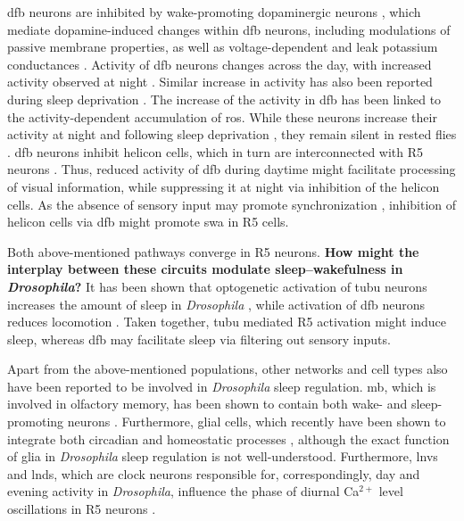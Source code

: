 \documentclass[../main.tex]{subfiles}
\begin{document}
\gls{dfb} neurons are inhibited by wake-promoting dopaminergic neurons \parencite{liuTwoDopaminergicNeurons2012}, which mediate dopamine-induced changes within \gls{dfb} neurons, including modulations of passive membrane properties, as well as voltage-dependent and leak potassium conductances \parencite{pimentelOperationHomeostaticSleep2016}. Activity of \gls{dfb} neurons changes across the day, with increased activity observed at night \parencite{raccugliaCoherentMultilevelNetwork2022}. Similar increase in activity has also been reported during sleep deprivation \parencite{pimentelOperationHomeostaticSleep2016}. The increase of the activity in \gls{dfb} has been linked to the activity-dependent accumulation of \gls{ros}.
While these neurons increase their activity at night and following sleep deprivation \parencite{raccugliaCoherentMultilevelNetwork2022}, they remain silent in rested flies \parencite{pimentelOperationHomeostaticSleep2016}.
\gls{dfb} neurons inhibit helicon cells, which in turn are interconnected with R5 neurons \parencite{suarez-grimaltNeuralArchitectureSleep2021,raccugliaCoherentMultilevelNetwork2022,shaferRegulationDrosophilaSleep2021}.
Thus, reduced activity of \gls{dfb} during daytime might facilitate processing of visual information, while suppressing it at night via inhibition of the helicon cells. As the absence of sensory input may promote synchronization \parencite{raccugliaCoherentMultilevelNetwork2022}, inhibition of helicon cells via \gls{dfb} might promote \gls{swa} in R5 cells.

Both above-mentioned pathways converge in R5 neurons. \textbf{How might the interplay between these circuits modulate sleep–wakefulness in \textit{Drosophila}?}
It has been shown that optogenetic activation of \gls{tubu} neurons increases the amount of sleep in \textit{Drosophila} \parencite{lamazeWakePromotingCircadianOutput2018}, while activation of \gls{dfb} neurons reduces locomotion \parencite{raccugliaCoherentMultilevelNetwork2022}. Taken together, \gls{tubu} mediated R5 activation might induce sleep, whereas \gls{dfb} may facilitate sleep via filtering out sensory inputs.

Apart from the above-mentioned populations, other networks and cell types also have been reported to be involved in \textit{Drosophila} sleep regulation. \gls{mb}, which is involved in olfactory memory, has been shown to contain both wake- and sleep-promoting neurons
\parencite{suarez-grimaltNeuralArchitectureSleep2021,dubowyCircadianRhythmsSleep2017}. Furthermore, glial cells, which recently have been shown to integrate both circadian and homeostatic processes \parencite{doppSinglecellTranscriptomicsReveals2024}, although the exact function of glia in \textit{Drosophila} sleep regulation is not well-understood. Furthermore,  \glspl{lnv} and \glspl{lnd}, which are clock neurons responsible for, correspondingly, day and evening activity in \textit{Drosophila}, influence the phase of diurnal Ca$^{2+}$ level oscillations in R5 neurons \parencite{andreaniCircadianProgrammingEllipsoid2022,liangMorningEveningCircadian2019}.
\end{document}
